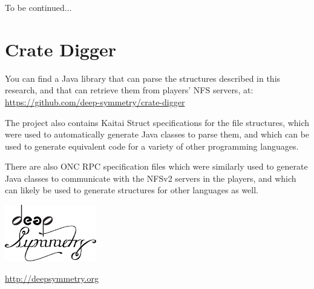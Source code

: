 \documentclass[11pt]{article}
\begin{document}
To be continued...

\section{Crate Digger}

You can find a Java library that can parse the structures described in
this research, and that can retrieve them from players' NFS servers,
at: \url{https://github.com/deep-symmetry/crate-digger}

The project also contains Kaitai Struct specifications for the file
structures, which were used to automatically generate Java classes to
parse them, and which can be used to generate equivalent code for a
variety of other programming languages.

There are also ONC RPC specification files which were similarly used
to generate Java classes to communicate with the NFSv2 servers in the
players, and which can likely be used to generate structures for other
languages as well.

\begin{appendix}

  \listoffigures

  \listoftables

  \begin{center}
    \begin{samepage}
      \includegraphics[width=4cm]{assets/DS-Logo-bw-4k}

      \vspace{0.25cm}
      \url{http://deepsymmetry.org}
    \end{samepage}
  \end{center}

\end{appendix}
\end{document}
